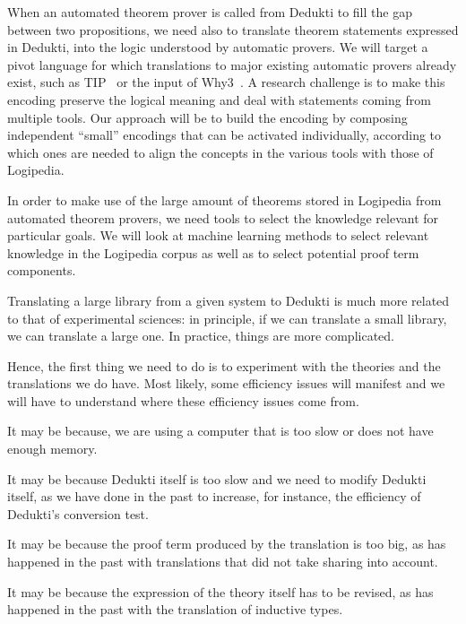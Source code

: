 When an automated theorem prover is called from Dedukti to fill the
gap between two propositions, we need also to translate theorem
statements expressed in Dedukti, into the logic understood by
automatic provers. We will target a pivot language for which
translations to major existing automatic provers already exist, such
as TIP~\cite{DBLP:conf/mkm/ClaessenJRS15} or the input of
Why3~\cite{DBLP:conf/esop/FilliatreP13}. A research challenge is to
make this encoding preserve the logical meaning and deal with
statements coming from multiple tools. Our approach will be to build
the encoding by composing independent ``small'' encodings that can be
activated individually, according to which ones are needed to align
the concepts in the various tools with those of Logipedia.

In order to make use of the large amount of theorems stored in
Logipedia from automated theorem provers, we need tools to select the
knowledge relevant for particular goals. We will look at machine
learning methods to select relevant knowledge in the Logipedia corpus
as well as to select potential proof term components.


Translating a large library from a given system to Dedukti is much
more related to that of experimental sciences: in principle, if we can
translate a small library, we can translate a large one. In practice,
things are more complicated.

Hence, the first thing we need to do is to experiment with the
theories and the translations we do have. Most likely, some efficiency
issues will manifest and we will have to understand where these
efficiency issues come from.

\begin{compactitem}
\item It may be because, we are using a computer that is too slow or
  does not have enough memory.
\item It may be because Dedukti itself is too slow and we need to modify
  Dedukti itself, as we have done in the past to increase, for instance,
  the efficiency of Dedukti's conversion test.
\item It may be because the proof term produced by the translation is
  too big, as has happened in the past with translations that did not
  take sharing into account.
\item It may be because the expression of the theory itself has to be
  revised, as has happened in the past with the translation of
  inductive types.
\end{compactitem}


